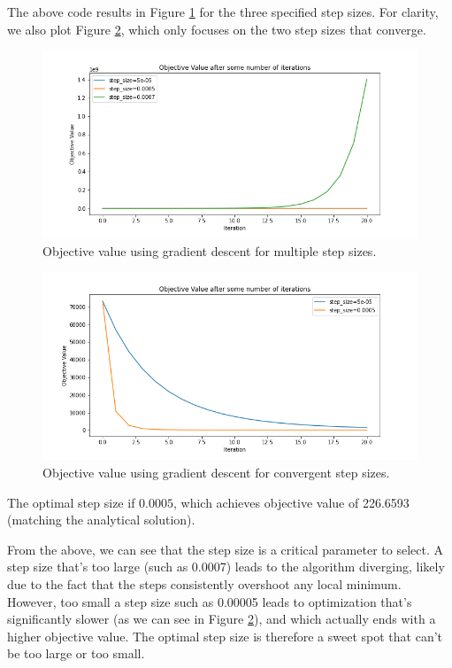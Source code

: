 \documentclass[12pt]{article}
\begin{document}
\begin{enumerate}[label=(\alph*)]
    The above code results in Figure \ref{fig:gradient_descent_all} for the three specified step sizes. For clarity, we also plot Figure \ref{fig:gradient_descent_convergent}, which only focuses on the two step sizes that converge.
    \begin{figure}[!ht]
      \centering
      \includegraphics[scale=0.5]{figures/gradient_descent_all.png}
      \caption{Objective value using gradient descent for multiple step sizes.}
      \label{fig:gradient_descent_all}
    \end{figure}
    \begin{figure}[!ht]
      \centering
      \includegraphics[scale=0.5]{figures/gradient_descent_converge.png}
      \caption{Objective value using gradient descent for convergent step sizes.}
      \label{fig:gradient_descent_convergent}
    \end{figure}

    The optimal step size if $0.0005$, which achieves objective value of 226.6593 (matching the analytical solution).


    From the above, we can see that the step size is a critical parameter to select. A step size that's too large (such as 0.0007) leads to the algorithm diverging, likely due to the fact that the steps consistently overshoot any local minimum. However, too small a step size such as 0.00005 leads to optimization that's significantly slower (as we can see in Figure \ref{fig:gradient_descent_convergent}), and which actually ends with a higher objective value. The optimal step size is therefore a sweet spot that can't be too large or too small.


\end{enumerate}
\end{document}
